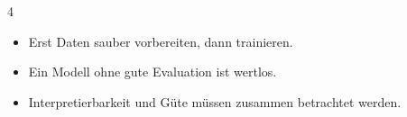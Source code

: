 \begin{landscape}
\begin{multicols*}{4}
        \begin{cheatSheetBox}[title=Merksätze]
            \begin{itemize}
                \item Erst Daten sauber vorbereiten, dann trainieren.
                \item Ein Modell ohne gute Evaluation ist wertlos.
                \item Interpretierbarkeit und Güte müssen zusammen betrachtet werden.
            \end{itemize}
        \end{cheatSheetBox}

    \end{multicols*}
\end{landscape}
\clearpage
\restoregeometry